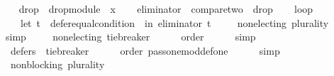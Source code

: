 \begin{isabellebody}
\ \ \isamarkupfalse%
\ {\isacharquery}{\kern0pt}drop{}\ {\isacharequal}{\kern0pt}\ {\isachardoublequoteopen}drop{\isacharunderscore}{\kern0pt}module\ {}\ x{\isachardoublequoteclose}\isanewline
\ \ \isamarkupfalse%
\ {\isacharquery}{\kern0pt}eliminator\ {\isacharequal}{\kern0pt}\ {\isachardoublequoteopen}{\isacharquery}{\kern0pt}compare{\isacharunderscore}{\kern0pt}two\ {\isasymparallel}\isactrlsub {\isasymup}\ {\isacharquery}{\kern0pt}drop{}{\isachardoublequoteclose}\isanewline
\ \ \isamarkupfalse%
\ {\isacharquery}{\kern0pt}loop\ {\isacharequal}{\kern0pt}\isanewline
\ \ \ \ {\isachardoublequoteopen}let\ t\ {\isacharequal}{\kern0pt}\ defer{\isacharunderscore}{\kern0pt}equal{\isacharunderscore}{\kern0pt}condition\ {}\ in\ {\isacharparenleft}{\kern0pt}{\isacharquery}{\kern0pt}eliminator\ {\isasymcirclearrowleft}\isactrlsub t{\isacharparenright}{\kern0pt}{\isachardoublequoteclose}\isanewline
\isanewline
\ \ \isamarkupfalse%
\ {}{}{}{}{}{\isacharcolon}{\kern0pt}\ {\isachardoublequoteopen}non{\isacharunderscore}{\kern0pt}electing\ {\isacharparenleft}{\kern0pt}plurality{\isasymdown}{\isacharparenright}{\kern0pt}{\isachardoublequoteclose}\isanewline
\ \ \ \ \isamarkupfalse%
\ simp\isanewline
\ \ \isamarkupfalse%
\ {}{}{}{}{}{\isacharcolon}{\kern0pt}\ {\isachardoublequoteopen}non{\isacharunderscore}{\kern0pt}electing\ {\isacharquery}{\kern0pt}tie{\isacharunderscore}{\kern0pt}breaker{\isachardoublequoteclose}\isanewline
\ \ \ \ \isamarkupfalse%
\ order\isanewline
\ \ \ \ \isamarkupfalse%
\ simp\isanewline
\ \ \isamarkupfalse%
\ {}{}{}{}{}{\isacharcolon}{\kern0pt}\ {\isachardoublequoteopen}defers\ {}\ {\isacharquery}{\kern0pt}tie{\isacharunderscore}{\kern0pt}breaker{\isachardoublequoteclose}\isanewline
\ \ \ \ \isamarkupfalse%
\ order\ pass{\isacharunderscore}{\kern0pt}one{\isacharunderscore}{\kern0pt}mod{\isacharunderscore}{\kern0pt}def{\isacharunderscore}{\kern0pt}one\isanewline
\ \ \ \ \isamarkupfalse%
\ simp\isanewline
\ \ \isamarkupfalse%
\ {}{}{}{}{}{\isacharcolon}{\kern0pt}\ {\isachardoublequoteopen}non{\isacharunderscore}{\kern0pt}blocking\ {\isacharparenleft}{\kern0pt}plurality{\isasymdown}{\isacharparenright}{\kern0pt}{\isachardoublequoteclose}\isanewline

\end{isabellebody}
